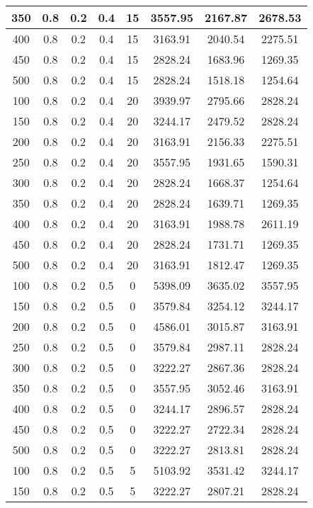 \documentclass[a4paper, 12pt]{extreport}
\begin{document}
\begin{itemize}
\begin{longtable}{|c|c|c|c|c|c|c|c|}
			350 & 0.8 & 0.2 & 0.4 & 15 & 3557.95 & 2167.87 & 2678.53 \\\hline
			400 & 0.8 & 0.2 & 0.4 & 15 & 3163.91 & 2040.54 & 2275.51 \\\hline
			450 & 0.8 & 0.2 & 0.4 & 15 & 2828.24 & 1683.96 & 1269.35 \\\hline
			500 & 0.8 & 0.2 & 0.4 & 15 & 2828.24 & 1518.18 & 1254.64 \\\hline
			100 & 0.8 & 0.2 & 0.4 & 20 & 3939.97 & 2795.66 & 2828.24 \\\hline
			150 & 0.8 & 0.2 & 0.4 & 20 & 3244.17 & 2479.52 & 2828.24 \\\hline
			200 & 0.8 & 0.2 & 0.4 & 20 & 3163.91 & 2156.33 & 2275.51 \\\hline
			250 & 0.8 & 0.2 & 0.4 & 20 & 3557.95 & 1931.65 & 1590.31 \\\hline
			300 & 0.8 & 0.2 & 0.4 & 20 & 2828.24 & 1668.37 & 1254.64 \\\hline
			350 & 0.8 & 0.2 & 0.4 & 20 & 2828.24 & 1639.71 & 1269.35 \\\hline
			400 & 0.8 & 0.2 & 0.4 & 20 & 3163.91 & 1988.78 & 2611.19 \\\hline
			450 & 0.8 & 0.2 & 0.4 & 20 & 2828.24 & 1731.71 & 1269.35 \\\hline
			500 & 0.8 & 0.2 & 0.4 & 20 & 3163.91 & 1812.47 & 1269.35 \\\hline
			100 & 0.8 & 0.2 & 0.5 & 0 & 5398.09 & 3635.02 & 3557.95 \\\hline
			150 & 0.8 & 0.2 & 0.5 & 0 & 3579.84 & 3254.12 & 3244.17 \\\hline
			200 & 0.8 & 0.2 & 0.5 & 0 & 4586.01 & 3015.87 & 3163.91 \\\hline
			250 & 0.8 & 0.2 & 0.5 & 0 & 3579.84 & 2987.11 & 2828.24 \\\hline
			300 & 0.8 & 0.2 & 0.5 & 0 & 3222.27 & 2867.36 & 2828.24 \\\hline
			350 & 0.8 & 0.2 & 0.5 & 0 & 3557.95 & 3052.46 & 3163.91 \\\hline
			400 & 0.8 & 0.2 & 0.5 & 0 & 3244.17 & 2896.57 & 2828.24 \\\hline
			450 & 0.8 & 0.2 & 0.5 & 0 & 3222.27 & 2722.34 & 2828.24 \\\hline
			500 & 0.8 & 0.2 & 0.5 & 0 & 3222.27 & 2813.81 & 2828.24 \\\hline
			100 & 0.8 & 0.2 & 0.5 & 5 & 5103.92 & 3531.42 & 3244.17 \\\hline
			150 & 0.8 & 0.2 & 0.5 & 5 & 3222.27 & 2807.21 & 2828.24 \\\hline

\end{longtable}
\end{itemize}
\end{document}
